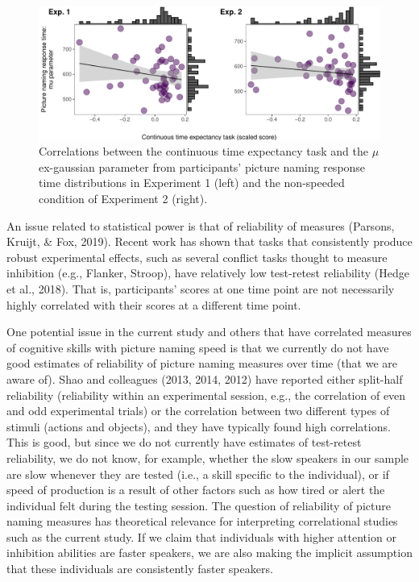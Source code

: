 \documentclass[
  man,floatsintext]{apa6}
\begin{document}
\begin{figure}
\centering
\includegraphics{task_difficulty_ind_dif_files/figure-latex/corr1and2-1.pdf}
\caption{\label{fig:corr1and2}Correlations between the continuous time expectancy task and the \(\mu\) ex-gaussian parameter from participants' picture naming response time distributions in Experiment 1 (left) and the non-speeded condition of Experiment 2 (right).}
\end{figure}

An issue related to statistical power is that of reliability of measures (Parsons, Kruijt, \& Fox, 2019). Recent work has shown that tasks that consistently produce robust experimental effects, such as several conflict tasks thought to measure inhibition (e.g., Flanker, Stroop), have relatively low test-retest reliability (Hedge et al., 2018). That is, participants' scores at one time point are not necessarily highly correlated with their scores at a different time point.

One potential issue in the current study and others that have correlated measures of cognitive skills with picture naming speed is that we currently do not have good estimates of reliability of picture naming measures over time (that we are aware of). Shao and colleagues (2013, 2014, 2012) have reported either split-half reliability (reliability within an experimental session, e.g., the correlation of even and odd experimental trials) or the correlation between two different types of stimuli (actions and objects), and they have typically found high correlations. This is good, but since we do not currently have estimates of test-retest reliability, we do not know, for example, whether the slow speakers in our sample are slow whenever they are tested (i.e., a skill specific to the individual), or if speed of production is a result of other factors such as how tired or alert the individual felt during the testing session. The question of reliability of picture naming measures has theoretical relevance for interpreting correlational studies such as the current study. If we claim that individuals with higher attention or inhibition abilities are faster speakers, we are also making the implicit assumption that these individuals are consistently faster speakers.
\end{document}
